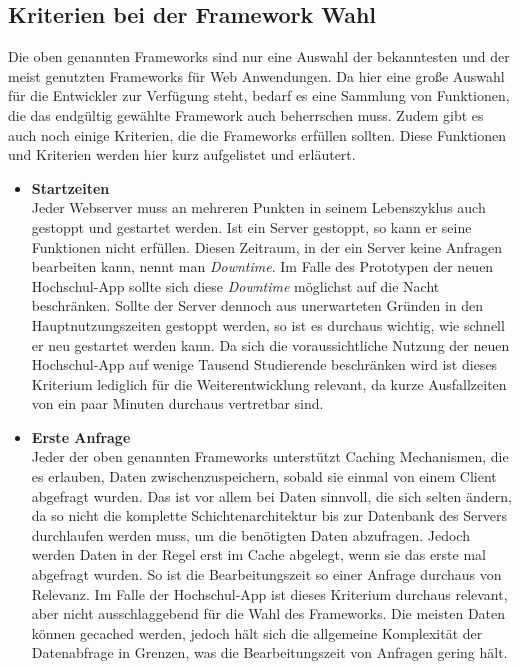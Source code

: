 \subsection*{Kriterien bei der Framework Wahl}
\label{sec:kriterien_framework}

Die oben genannten Frameworks sind nur eine Auswahl der bekanntesten und der meist genutzten Frameworks für Web Anwendungen. Da hier eine große Auswahl für die Entwickler zur Verfügung steht, bedarf es eine Sammlung von Funktionen, die das endgültig gewählte Framework auch beherrschen muss. Zudem gibt es auch noch einige Kriterien, die die Frameworks erfüllen sollten. Diese Funktionen und Kriterien werden hier kurz aufgelistet und erläutert.

\begin{itemize}

\item \textbf{Startzeiten}\\
Jeder Webserver muss an mehreren Punkten in seinem Lebenszyklus auch gestoppt und gestartet werden. Ist ein Server gestoppt, so kann er seine Funktionen nicht erfüllen. Diesen Zeitraum, in der ein Server keine Anfragen bearbeiten kann, nennt man \textit{Downtime}. Im Falle des Prototypen der neuen Hochschul-\ac{App} sollte sich diese \textit{Downtime} möglichst auf die Nacht beschränken. Sollte der Server dennoch aus unerwarteten Gründen in den Hauptnutzungszeiten gestoppt werden, so ist es durchaus wichtig, wie schnell er neu gestartet werden kann. Da sich die voraussichtliche Nutzung der neuen Hoch\-schul-\ac{App} auf wenige Tausend Studierende beschränken wird ist dieses Kriterium lediglich für die Weiterentwicklung relevant, da kurze Ausfallzeiten von ein paar Minuten durchaus vertretbar sind.

\item \textbf{Erste Anfrage}\\
Jeder der oben genannten Frameworks unterstützt Caching Mechanismen, die es erlauben, Daten zwischenzuspeichern, sobald sie einmal von einem Client abgefragt wurden. Das ist vor allem bei Daten sinnvoll, die sich selten ändern, da so nicht die komplette Schichtenarchitektur bis zur Datenbank des Servers durchlaufen werden muss, um die benötigten Daten abzufragen. Jedoch werden Daten in der Regel erst im Cache abgelegt, wenn sie das erste mal abgefragt wurden. So ist die Bearbeitungszeit so einer Anfrage durchaus von Relevanz. Im Falle der Hochschul-\ac{App} ist dieses Kriterium durchaus relevant, aber nicht ausschlaggebend für die Wahl des Frameworks. Die meisten Daten können gecached werden, jedoch hält sich die allgemeine Komplexität der Datenabfrage in Grenzen, was die Bearbeitungszeit von Anfragen gering hält.


\end{itemize}
